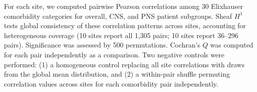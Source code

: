 \documentclass{article}
\begin{document}
For each site, we computed pairwise Pearson correlations among 30 Elixhauser comorbidity categories for overall, CNS, and PNS patient subgroups.
Sheaf $H^1$ \cite{robinson2017sheaf} tests global consistency of these correlation patterns across sites, accounting for heterogeneous coverage (10 sites report all 1,305 pairs; 10 sites report 36--296 pairs).
Significance was assessed by 500 permutations.
Cochran's $Q$ was computed for each pair independently as a comparison.
Two negative controls were performed: (1) a homogeneous control replacing all site correlations with draws from the global mean distribution, and (2) a within-pair shuffle permuting correlation values across sites for each comorbidity pair independently.




\end{document}
